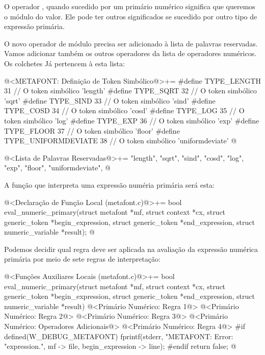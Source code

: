 O operador , quando sucedido por um primário
numérico significa que queremos o módulo do valor. Ele pode ter outros
significados se sucedido por outro tipo de expressão primária.

O novo operador de módulo precisa ser adicionado à lista de palavras
reservadas. Vamos adicionar também os outros operadores da lista de
operadores numéricos. Os colchetes Já pertencem à esta lista:

\iniciocodigo
@<METAFONT: Definição de Token Simbólico@>+=
#define TYPE_LENGTH         31 // O token simbólico 'length'
#define TYPE_SQRT           32 // O token simbólico 'sqrt'
#define TYPE_SIND           33 // O token simbólico 'sind'
#define TYPE_COSD           34 // O token simbólico 'cosd'
#define TYPE_LOG            35 // O token simbólico 'log'
#define TYPE_EXP            36 // O token simbólico 'exp'
#define TYPE_FLOOR          37 // O token simbólico 'floor'
#define TYPE_UNIFORMDEVIATE 38 // O token simbólico 'uniformdeviate'
@
\fimcodigo

\iniciocodigo
@<Lista de Palavras Reservadas@>+=
"length", "sqrt", "sind", "cosd", "log", "exp", "floor", "uniformdeviate",
@
\fimcodigo

A função que interpreta uma expressão numéria primária será esta:

\iniciocodigo
@<Declaração de Função Local (metafont.c)@>+=
bool eval_numeric_primary(struct metafont *mf, struct context *cx,
                          struct generic_token *begin_expression,
                          struct generic_token *end_expression,
                          struct numeric_variable *result);
@
\fimcodigo

Podemos decidir qual regra deve ser aplicada na avaliação da expressão
numérica primária por meio de sete regras de interpretação:

\iniciocodigo
@<Funções Auxiliares Locais (metafont.c)@>+=
bool eval_numeric_primary(struct metafont *mf, struct context *cx,
                          struct generic_token *begin_expression,
                          struct generic_token *end_expression,
                          struct numeric_variable *result){
  @<Primário Numérico: Regra 1@>
  @<Primário Numérico: Regra 2@>
  @<Primário Numérico: Regra 3@>
  @<Primário Numérico: Operadores Adicionais@>
  @<Primário Numérico: Regra 4@>
#if defined(W_DEBUG_METAFONT)
  fprintf(stderr, "METAFONT: Error: %
          "expression.\n",  mf -> file, begin_expression -> line);
#endif
  return false;
}
@

